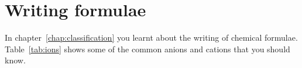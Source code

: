          \section{Writing formulae}
    \nopagebreak
In chapter~\ref{chap:classification} you learnt about the writing of chemical formulae. Table~\ref{tab:ions} shows some of the common anions and cations that you should know.
